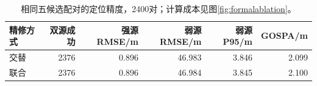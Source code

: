 \begin{table}[H]\centering\small
\caption{相同五候选配对的定位精度，2400对；计算成本见图\ref{fig:formalablation}。}\label{tab:fivepair}
\begin{tabular}{@{}lrrrrr@{}}\toprule
精修方式 & 双源成功 & 强源RMSE/m & 弱源RMSE/m & 弱源P95/m & GOSPA/m\\\midrule
交替 & 2376 & 0.896 & 46.983 & 3.846 & 2.099\\
联合 & 2376 & 0.896 & 46.984 & 3.845 & 2.100\\
\bottomrule\end{tabular}\end{table}
